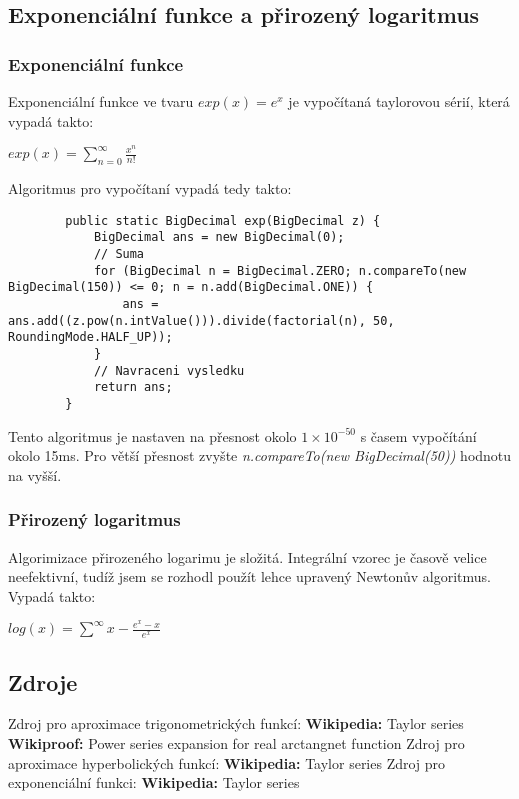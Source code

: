 \documentclass{article}
\begin{document}
    \subsection{Exponenciální funkce a přirozený logaritmus}
    \subsubsection{Exponenciální funkce}
    Exponenciální funkce ve tvaru $exp(x) = e^x$ je vypočítaná taylorovou sérií, která vypadá takto:
    \begin{center}
        $exp(x)=\displaystyle\sum_{n=0}^{\infty}\frac{x^n}{n!}$
    \end{center}
    Algoritmus pro vypočítaní vypadá tedy takto:
    \begin{lstlisting}
        public static BigDecimal exp(BigDecimal z) {
            BigDecimal ans = new BigDecimal(0);
            // Suma
            for (BigDecimal n = BigDecimal.ZERO; n.compareTo(new BigDecimal(150)) <= 0; n = n.add(BigDecimal.ONE)) {
                ans = ans.add((z.pow(n.intValue())).divide(factorial(n), 50, RoundingMode.HALF_UP));
            }
            // Navraceni vysledku
            return ans;
        }
    \end{lstlisting}
    Tento algoritmus je nastaven na přesnost okolo $1\times{10^{-50}}$ s časem vypočítání okolo 15ms. Pro
    větší přesnost zvyšte \textit{n.compareTo(new BigDecimal(50))} hodnotu na vyšší.
    \subsubsection{Přirozený logaritmus}
    Algorimizace přirozeného logarimu je složitá. Integrální vzorec je časově velice neefektivní, tudíž jsem
    se rozhodl použít lehce upravený Newtonův algoritmus. Vypadá takto:
    \begin{center}
        $log(x)=\displaystyle\sum^{\infty}x-\frac{e^x-x}{e^x}$
    \end{center}
    \subsection{Zdroje}
    Zdroj pro aproximace trigonometrických funkcí: \newline
    \indent \textbf{Wikipedia:} Taylor series \newline
    \indent \textbf{Wikiproof:} Power series expansion for real arctangnet function \newline
    Zdroj pro aproximace hyperbolických funkcí: \newline
    \indent \textbf{Wikipedia:} Taylor series \newline
    Zdroj pro exponenciální funkci: \newline
    \indent \textbf{Wikipedia:} Taylor series \newline
    
\end{document}
